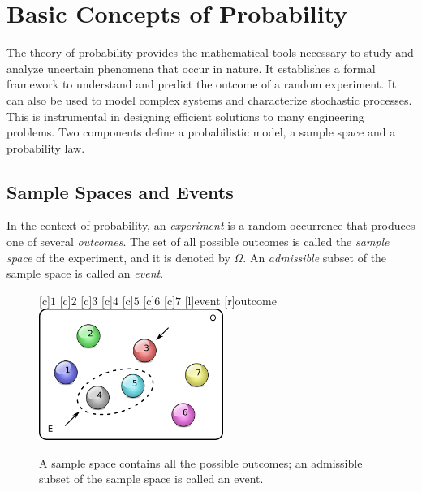 \chapter[Basic Concepts]{Basic Concepts of Probability}

The theory of probability provides the mathematical tools necessary to study and analyze uncertain phenomena that occur in nature.
It establishes a formal framework to understand and predict the outcome of a random experiment.
It can also be used to model complex systems and characterize stochastic processes.
This is instrumental in designing efficient solutions to many engineering problems.
Two components define a probabilistic model, a sample space and a probability law.


\section{Sample Spaces and Events}

In the context of probability, an \emph{experiment} is a random occurrence that produces one of several \emph{outcomes}.
The set of all possible outcomes is called the \emph{sample space} of the experiment, and it is denoted by $\Omega$.
An \emph{admissible} subset of the sample space is called an \emph{event}.

\begin{figure}[htb!]
\begin{center}
\begin{psfrags}
[c]{$1$}
[c]{$2$}
[c]{$3$}
[c]{$4$}
[c]{$5$}
[c]{$6$}
[c]{$7$}
[l]{event}
[r]{outcome}
\includegraphics[height=4.275cm]{Figures/2Chapter/samplespace}
\end{psfrags}
\caption{A sample space contains all the possible outcomes; an admissible subset of the sample space is called an event.}
\label{figure:SampleSpace}
\end{center}
\end{figure}

